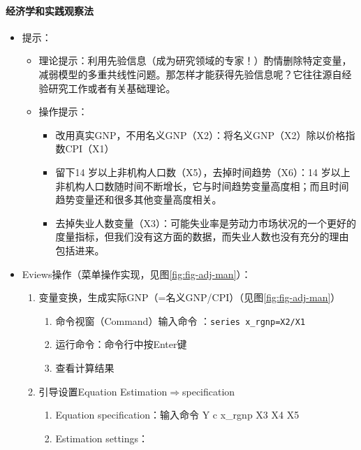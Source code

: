 \documentclass[12pt,(landscape,a4paper),(portrait,a4paper)]{article}
\providecommand{\tightlist}{%
  \setlength{\itemsep}{0pt}\setlength{\parskip}{0pt}}
\let\oldparagraph\paragraph
\renewcommand{\paragraph}[1]{\oldparagraph{#1}\mbox{}}
\begin{document}
\paragraph{经济学和实践观察法}

\begin{itemize}
\tightlist
\item
  提示：

  \begin{itemize}
  \item
    理论提示：利用先验信息（成为研究领域的专家！）酌情删除特定变量，减弱模型的多重共线性问题。那怎样才能获得先验信息呢？它往往源自经验研究工作或者有关基础理论。
  \item
    操作提示：

    \begin{itemize}
    \tightlist
    \item
      改用真实GNP，不用名义GNP（X2）：将名义GNP（X2）除以价格指数CPI（X1）
    \item
      留下14 岁以上非机构人口数（X5），去掉时间趋势（X6）：14
      岁以上非机构人口数随时间不断增长，它与时间趋势变量高度相；而且时间趋势变量还和很多其他变量高度相关。
    \item
      去掉失业人数变量（X3）：可能失业率是劳动力市场状况的一个更好的度量指标，但我们没有这方面的数据，而失业人数也没有充分的理由包括进来。
    \end{itemize}
  \end{itemize}
\item
  Eviews操作（菜单操作实现，见图\ref{fig:fig-adj-man}）：

  \begin{enumerate}
  \def\labelenumi{\arabic{enumi})}
  \item
    变量变换，生成实际GNP（=名义GNP/CPI）（见图\ref{fig:fig-adj-man}）

    \begin{enumerate}
    \def\labelenumii{\alph{enumii}.}
    \tightlist
    \item
      命令视窗（Command）输入命令 ：\texttt{series\ x\_rgnp=X2/X1}
    \item
      运行命令：命令行中按Enter键
    \item
      查看计算结果\\
    \end{enumerate}
  \item
    引导设置Equation Estimation\(\Rightarrow\)specification

    \begin{enumerate}
    \def\labelenumii{\alph{enumii}.}
    \tightlist
    \item
      Equation specification：输入命令 Y c x\_rgnp X3 X4 X5
    \item
      Estimation settings：


\end{enumerate}
\end{enumerate}
\end{itemize}
\end{document}
